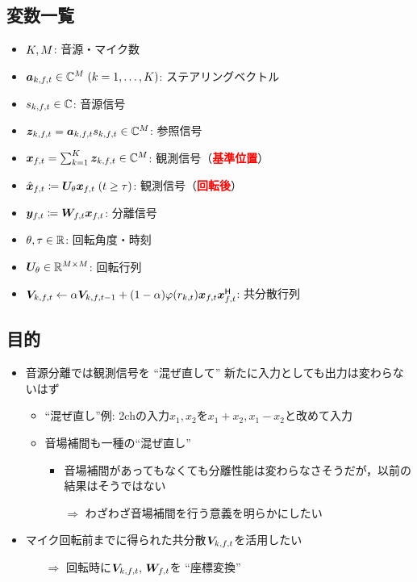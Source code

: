 \documentclass[twocolumn,9pt,dvipdfmx]{article}
\begin{document}
\subsection*{変数一覧}
\begin{itemize}
  \item $K, M$: 音源・マイク数
  \item $\steer _{\src,\ft} \in \C ^{\Mic}\; (\src = 1, \dots, \Src)$: ステアリングベクトル
  \item $\sig _{\src,\ft} \in \C$: 音源信号
  \item $\Img _{\src,\ft} = \steer _{\src,\ft} \sig _{\src,\ft} \in \C^{\Mic}$: 参照信号%
  \item $\Obs _{\ft} = \sum _{\src=1} ^{\Src} \Img _{\src,\ft} \in \C^{\Mic}$: 観測信号（\textcolor{red}{\textbf{基準位置}}）
  \item $\rotObs _{\ft} \coloneqq \rotMat _{\rotDeg} \Obs _{\ft} \; (\tframe \geq \rotFra)$: 観測信号（\textcolor{red}{\textbf{回転後}}）
  \item $\Est _{\ft} \coloneqq \Demix _{\ft} \Obs _{\ft}$: 分離信号
  \item $\theta, \tau \in \mathbb{R}$: 回転角度・時刻
  \item $\bm{U} _{\theta} \in \mathbb{R} ^{M \times M}$: 回転行列
  \item $\cov _{\src,\ft} \gets \forget \cov _{\src,\ft[-1]} + (1 - \forget) \weight (\var _{\src,\tframe}) \Obs _{\ft} \Obs _{\ft} ^{\hermite}$: 共分散行列
\end{itemize}

\subsection*{目的}
\begin{itemize}
  \item 音源分離では観測信号を ``混ぜ直して'' 新たに入力としても出力は変わらないはず
    \begin{itemize}
      \item ``混ぜ直し''例: 2chの入力$x_1, x_2$を$x_1+x_2, x_1-x_2$と改めて入力
      \item 音場補間も一種の``混ぜ直し''
        \begin{itemize}
          \item 音場補間があってもなくても分離性能は変わらなさそうだが，以前の結果はそうではない
          \item[$\Rightarrow$] わざわざ音場補間を行う意義を明らかにしたい
        \end{itemize}
    \end{itemize}
  \item マイク回転前までに得られた共分散$\cov _{\src,\ft}$を活用したい
    \begin{itemize}
      \item[$\Rightarrow$] 回転時に$\cov _{\src,\ft},\, \Demix _{\ft}$を ``座標変換''
    \end{itemize}
\end{itemize}
\end{document}
